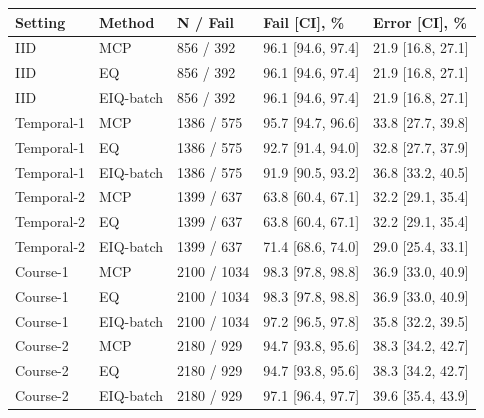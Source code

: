 \begin{tabular}{lllll}
\toprule
Setting & Method & N / Fail & Fail [CI], \% & Error [CI], \%\\
\midrule
IID & MCP & 856 / 392 & 96.1 [94.6, 97.4] & 21.9 [16.8, 27.1]\\
IID & EQ & 856 / 392 & 96.1 [94.6, 97.4] & 21.9 [16.8, 27.1]\\
IID & EIQ-batch & 856 / 392 & 96.1 [94.6, 97.4] & 21.9 [16.8, 27.1]\\
Temporal-1 & MCP & 1386 / 575 & 95.7 [94.7, 96.6] & 33.8 [27.7, 39.8]\\
Temporal-1 & EQ & 1386 / 575 & 92.7 [91.4, 94.0] & 32.8 [27.7, 37.9]\\
Temporal-1 & EIQ-batch & 1386 / 575 & 91.9 [90.5, 93.2] & 36.8 [33.2, 40.5]\\
Temporal-2 & MCP & 1399 / 637 & 63.8 [60.4, 67.1] & 32.2 [29.1, 35.4]\\
Temporal-2 & EQ & 1399 / 637 & 63.8 [60.4, 67.1] & 32.2 [29.1, 35.4]\\
Temporal-2 & EIQ-batch & 1399 / 637 & 71.4 [68.6, 74.0] & 29.0 [25.4, 33.1]\\
Course-1 & MCP & 2100 / 1034 & 98.3 [97.8, 98.8] & 36.9 [33.0, 40.9]\\
Course-1 & EQ & 2100 / 1034 & 98.3 [97.8, 98.8] & 36.9 [33.0, 40.9]\\
Course-1 & EIQ-batch & 2100 / 1034 & 97.2 [96.5, 97.8] & 35.8 [32.2, 39.5]\\
Course-2 & MCP & 2180 / 929 & 94.7 [93.8, 95.6] & 38.3 [34.2, 42.7]\\
Course-2 & EQ & 2180 / 929 & 94.7 [93.8, 95.6] & 38.3 [34.2, 42.7]\\
Course-2 & EIQ-batch & 2180 / 929 & 97.1 [96.4, 97.7] & 39.6 [35.4, 43.9]\\
\bottomrule
\end{tabular}
